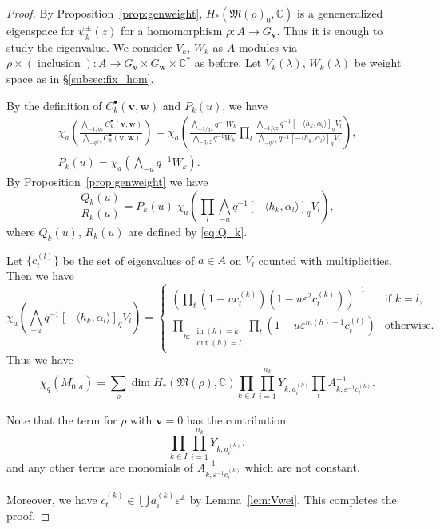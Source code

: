 \documentclass[12pt]{amsart}
\def\Bbb{\mathbb}
\def\frak{\mathfrak}
\theoremstyle{definition}
\theoremstyle{remark}
\numberwithin{equation}{subsection}
\newcommand{\lemref}[1]{Lemma~\ref{#1}}
\newcommand{\propref}[1]{Proposition~\ref{#1}}
\newcommand{\subsecref}[1]{\S\ref{#1}}
\newcommand{\C}{{\Bbb C}}
\newcommand{\Z}{{\Bbb Z}}
\newcommand{\vin}{\operatorname{in}} %
\newcommand{\vout}{\operatorname{out}} %
\newcommand{\M}{{\frak M}} %
\newcommand{\bv}{{\mathbf v}} %
\newcommand{\bw}{{\mathbf w}} %
\newcommand{\Wedge}{{\textstyle \bigwedge}}
\begin{document}
\begin{proof}
By \propref{prop:genweight}, $H_*(\M(\rho)_0,\C)$ is a geneneralized
eigenspace for $\psi_k^\pm(z)$ for a homomorphism $\rho\colon A\to
G_\bv$. Thus it is enough to study the eigenvalue.
%
We consider $V_k$, $W_k$ as $A$-modules via
$\rho\times(\operatorname{inclusion})\colon A\to G_\bv\times
G_\bw\times\C^*$ as before. Let $V_k(\lambda)$, $W_k(\lambda)$ be
weight space as in \subsecref{subsec:fix_hom}.

By the definition of $C_k^\bullet(\bv,\bw)$ and $P_k(u)$, we have
\begin{equation*}
\begin{gathered}
  \chi_a\left(\frac{\Wedge_{-1/qz}C_k^\bullet(\bv,\bw)}
        {\Wedge_{-q/z}C_k^\bullet(\bv,\bw)}\right)
  = \chi_a\left(
     \frac{\Wedge_{-1/qz}q^{-1}W_k}{\Wedge_{-q/z}q^{-1}W_k}
     \prod_l \frac{\Wedge_{-1/qz}q^{-1}
     [-\langle h_k, \alpha_l\rangle]_q V_l}
        {\Wedge_{-q/z}q^{-1}
     [-\langle h_k, \alpha_l\rangle]_q V_l}\right), \\
   P_k(u) = \chi_a\left(\Wedge_{-u} q^{-1} W_k\right).
\end{gathered}
\end{equation*}
By \propref{prop:genweight} we have
\begin{equation*}
   \frac{Q_k(u)}{R_k(u)} = P_k(u)\; 
    \chi_a\left(
     \prod_l \Wedge_{-u}q^{-1}
     [-\langle h_k, \alpha_l\rangle]_q V_l \right),
\end{equation*}
where $Q_k(u)$, $R_k(u)$ are defined by \eqref{eq:Q_k}.

Let $\{ c^{(l)}_t \}$ be the set of eigenvalues of $a\in A$ on $V_l$
counted with multiplicities. Then we have
\begin{equation*}
   \chi_a(\Wedge_{-u} q^{-1} [-\langle h_k, \alpha_l\rangle]_q V_l)
   = 
   \begin{cases}{\displaystyle
     \left(\prod_t (1 - u c^{(k)}_t)
             (1 - u \varepsilon^{2}c^{(k)}_t)\right)^{-1}}
        & \text{if $k=l$}, \\
     {\displaystyle \prod_{h: \substack{\vin(h) = k\\ \vout(h) = l}}
     \prod_t (1 - u \varepsilon^{m(h)+1} c^{(l)}_t)}
        & \text{otherwise}.
   \end{cases}
\end{equation*}
Thus we have
\begin{equation*}
   \chi_q(M_{0,a})
  = \sum_{\rho} \dim H_*(\M(\rho),\C)
 \prod_{k\in I}\prod_{i=1}^{n_k} Y_{k,a_i^{(k)}}
 \prod_t A_{k,\varepsilon^{-1}c^{(k)}_t}^{-1}.
\end{equation*}

Note that the term for $\rho$ with $\bv = 0$ has the contribution
\begin{equation*}
  \prod_{k\in I}\prod_{i=1}^{n_k} Y_{k,a_i^{(k)}},
\end{equation*}
and any other terms are monomials of
$A_{k,\varepsilon^{-1}c^{(k)}_t}^{-1}$ which are not constant.

Moreover, we have $c^{(k)}_t\in \bigcup a_i^{(k)} \varepsilon^{\Z}$ by
\lemref{lem:Vwei}. This completes the proof.
\end{proof}
\end{document}
